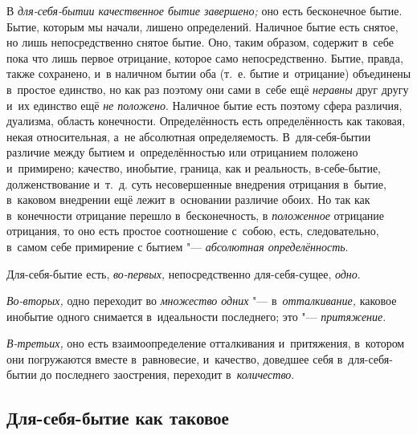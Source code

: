 В {\em для-себя-бытии качественное бытие завершено;} оно
есть бесконечное бытие. Бытие, которым мы начали, лишено определений.
Наличное бытие есть снятое, но лишь непосредственно снятое бытие. Оно,
таким образом, содержит в~себе пока что лишь первое отрицание, которое само
непосредственно. Бытие, правда, также сохранено, и~в наличном бытии оба
(т.~е. бытие и~отрицание) объединены в~простое единство, но как раз поэтому
они сами в~себе ещё {\em неравны} друг другу и~их
единство ещё {\em не положено}. Наличное бытие есть
поэтому сфера различия, дуализма, область конечности. Определённость
есть определённость как таковая, некая относительная, а~не абсолютная
определяемость. В~для-себя-бытии различие между бытием и~определённостью
или отрицанием положено и~примирено; качество, инобытие, граница, как и
реальность, в-себе-бытие, долженствование и~т.~д. суть несовершенные
внедрения отрицания в~бытие, в~каковом внедрении ещё лежит в~основании
различие обоих. Но так как в~конечности отрицание перешло в~бесконечность,
в {\em положенное} отрицание отрицания, то оно есть
простое соотношение с~собою, есть, следовательно, в~самом себе примирение с
бытием "--- {\em абсолютная определённость}.

Для-себя-бытие есть, {\em во-первых,} непосредственно
для-себя-сущее, {\em одно}.

{\em Во-вторых,} одно переходит во {\em множество одних} "---
в~{\em отталкивание,} каковое инобытие одного снимается
в~идеальности последнего; это "--- {\em притяжение}.

{\em В-третьих,} оно есть взаимоопределение отталкивания и~притяжения,
в~котором они погружаются вместе в~равновесие, и~качество, доведшее себя
в~для-себя-бытии до последнего заострения, переходит в~{\em количество}.

\subsection{Для-себя-бытие как таковое}

